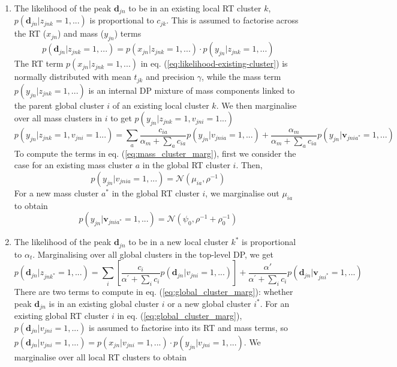 \begin{enumerate}
\item The likelihood of the peak $\mathbf{d}_{jn}$ to be in an existing local RT cluster $k$, $p(\mathbf{d}_{jn} \vert z_{jnk}=1,...)$ is proportional to $c_{jk}$. This is assumed to factorise across the RT ($x_{jn}$) and mass ($y_{jn}$) terms
\begin{dmath}
p(\mathbf{d}_{jn} \vert z_{jnk}=1,...)=p(x_{jn} \vert z_{jnk}=1,...)\cdot p(y_{jn} \vert z_{jnk}=1,...)
\label{eq:likelihood-existing-cluster}
\end{dmath}
The RT term $p(x_{jn} \vert z_{jnk}=1,...)$ in eq. (\ref{eq:likelihood-existing-cluster}) is normally distributed with mean $t_{jk}$ and precision $\gamma$, while the mass term $p(y_{jn} \vert z_{jnk}=1,...)$ is an internal DP mixture of mass components linked to the parent global cluster $i$ of an existing local cluster $k$. We then marginalise over all mass clusters in $i$ to get $p(y_{jn} \vert z_{jnk}=1,v_{jni}=1...)$
\begin{dmath}
p(y_{jn} \vert z_{jnk}=1,v_{jni}=1...)=\sum_{a}\frac{c_{ia}}{\alpha_{m}+\sum_{a}c_{ia}}p(y_{jn} \vert v_{jnia}=1,...)+\frac{\alpha_{m}}{\alpha_{m}+\sum_{a}c_{ia}}p(y_{jn} \vert \boldsymbol{v}_{jnia^{*}}=1,...)
\label{eq:mass_cluster_marg}
\end{dmath}
To compute the terms in eq. (\ref{eq:mass_cluster_marg}), first we consider the case for an existing mass cluster $a$ in the global RT cluster $i$. Then,
\begin{dmath}
p(y_{jn} \vert v_{jnia}=1,...)=\mathcal{N}(\mu_{ia},\rho^{-1})
\end{dmath}
For a new mass cluster $a^{*}$ in the global RT cluster $i$, we marginalise out $\mu_{ia}$ to obtain
\begin{dmath}
p(y_{jn} \vert \boldsymbol{v}_{jnia^{*}}=1,...)=\mathcal{N}(\psi_{0},\rho^{-1}+\rho_{0}^{-1})
\end{dmath}
\item The likelihood of the peak $\mathbf{d}_{jn}$ to be in a new local cluster $k^{*}$ is proportional to $\alpha_{t}$. Marginalising over all global clusters in the top-level DP, we get
\begin{dmath}
p(\mathbf{d}_{jn} \vert z_{jnk^{*}}=1,...)=\sum_{i}\left[\frac{c_{i}}{\alpha^{'}+\sum_{i}c_{i}}p(\mathbf{d}_{jn} \vert v_{jni}=1,...)\right]+\frac{\alpha'}{\alpha^{'}+\sum_{i}c_{i}}p(\mathbf{d}_{jn} \vert \boldsymbol{v}_{jni^{*}}=1,...)
\label{eq:global_cluster_marg}
\end{dmath}
There are two terms to compute in eq. (\ref{eq:global_cluster_marg}): whether peak $\mathbf{d}_{jn}$ is in an existing global cluster $i$ or a new global cluster $i^{*}$. For an existing global RT cluster $i$ in eq. (\ref{eq:global_cluster_marg}), $p(\mathbf{d}_{jn} \vert v_{jni}=1,...)$ is assumed to factorise into its RT and mass terms, so $p(\mathbf{d}_{jn} \vert v_{jni}=1,...) = p(x_{jn} \vert v_{jni}=1,...)\cdot p(y_{jn} \vert v_{jni}=1,...)$. We marginalise over all local RT clusters to obtain

\end{enumerate}
